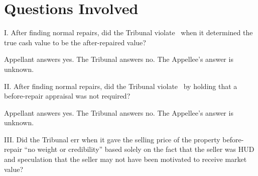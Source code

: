 \documentclass[12pt,\documentclassflag]{michiganCourtOfAppealsBrief}
\begin{document}






\newpage 
\section{Questions Involved} 

\noindent I. After finding normal repairs, did the Tribunal violate \mathieuGast\ when it determined the true cash value to be the after-repaired value? 

Appellant answers yes. The Tribunal answers no. The Appellee's answer is unknown. 
\vspace{\baselineskip}

\noindent II. After finding normal repairs, did the Tribunal violate \mathieuGast\ by holding that a before-repair appraisal was not required?

Appellant answers yes. The Tribunal answers no. The Appellee's answer is unknown. 
\vspace{\baselineskip}

\noindent III. Did the Tribunal err when it gave the selling price of the property before-repair ``no weight or credibility'' based solely on the fact that the seller was HUD and speculation that the seller may not have been motivated to receive market value?
\end{document}
